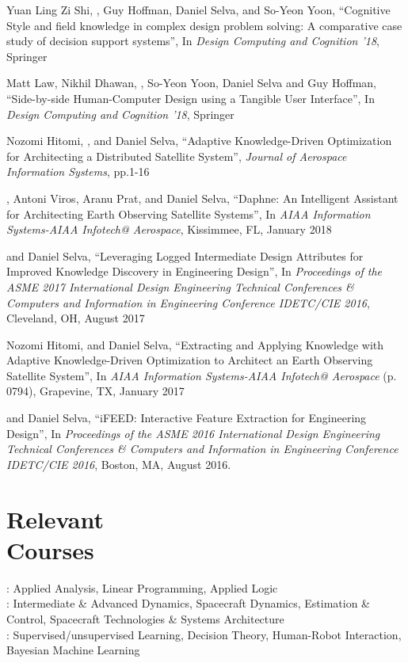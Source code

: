 \documentclass[mm]{simple_style}
\begin{document}
\begin{resume}
Yuan Ling Zi Shi, , Guy Hoffman, Daniel Selva, and So-Yeon Yoon, “Cognitive Style and field knowledge in complex design problem solving: A comparative case study of decision support systems”, In \textit{Design Computing and Cognition ’18}, Springer

Matt Law, Nikhil Dhawan, , So-Yeon Yoon, Daniel Selva and Guy Hoffman, “Side-by-side Human-Computer Design using a Tangible User Interface”, In \textit{Design Computing and Cognition ’18}, Springer

Nozomi Hitomi, , and Daniel Selva, “Adaptive Knowledge-Driven Optimization for Architecting a Distributed Satellite System”, \textit{Journal of Aerospace Information Systems}, pp.1-16

, Antoni Viros, Aranu Prat, and Daniel Selva, “Daphne: An Intelligent Assistant for Architecting Earth Observing Satellite Systems”, In \textit{AIAA Information Systems-AIAA Infotech@ Aerospace}, Kissimmee, FL, January 2018

 and Daniel Selva, “Leveraging Logged Intermediate Design Attributes for Improved Knowledge Discovery in Engineering Design”, In \textit{Proceedings of the ASME 2017 International Design Engineering Technical Conferences \& Computers and Information in Engineering Conference IDETC/CIE 2016}, Cleveland, OH, August 2017

Nozomi Hitomi,  and Daniel Selva, “Extracting and Applying Knowledge with Adaptive Knowledge-Driven Optimization to Architect an Earth Observing Satellite System”, In \textit{AIAA Information Systems-AIAA Infotech@ Aerospace} (p. 0794), Grapevine, TX, January 2017

 and Daniel Selva, “iFEED: Interactive Feature Extraction for Engineering Design”, In \textit{Proceedings of the ASME 2016 International Design Engineering Technical Conferences \& Computers and Information in Engineering Conference IDETC/CIE 2016}, Boston, MA, August 2016.

\newpage
\vspace{-2ex}
\sectionline

\section{Relevant\\Courses}
: Applied Analysis, Linear Programming, Applied Logic\\
: Intermediate \& Advanced Dynamics, Spacecraft Dynamics, Estimation \& Control, Spacecraft Technologies \& Systems Architecture\\
: Supervised/unsupervised Learning, Decision Theory, Human-Robot Interaction, Bayesian Machine Learning


\end{resume}
\end{document}
